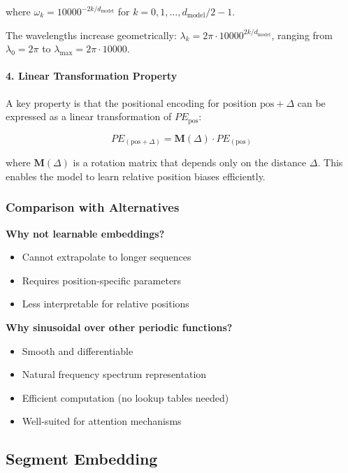 \documentclass[11pt,a4paper]{article}
\begin{document}
where $\omega_k = 10000^{-2k/d_{\text{model}}}$ for $k = 0, 1, \ldots, d_{\text{model}}/2 - 1$.

The wavelengths increase geometrically: $\lambda_k = 2\pi \cdot 10000^{2k/d_{\text{model}}}$, ranging from $\lambda_0 = 2\pi$ to $\lambda_{\max} = 2\pi \cdot 10000$.

\paragraph{4. Linear Transformation Property}
A key property is that the positional encoding for position $\text{pos} + \Delta$ can be expressed as a linear transformation of $PE_{\text{pos}}$:

\begin{equation}
PE_{(\text{pos}+\Delta)} = \mathbf{M}(\Delta) \cdot PE_{(\text{pos})}
\end{equation}

where $\mathbf{M}(\Delta)$ is a rotation matrix that depends only on the distance $\Delta$. This enables the model to learn relative position biases efficiently.

\subsubsection{Comparison with Alternatives}

\textbf{Why not learnable embeddings?}
\begin{itemize}
    \item Cannot extrapolate to longer sequences
    \item Requires position-specific parameters
    \item Less interpretable for relative positions
\end{itemize}

\textbf{Why sinusoidal over other periodic functions?}
\begin{itemize}
    \item Smooth and differentiable
    \item Natural frequency spectrum representation
    \item Efficient computation (no lookup tables needed)
    \item Well-suited for attention mechanisms
\end{itemize}

\subsection{Segment Embedding}
\end{document}
